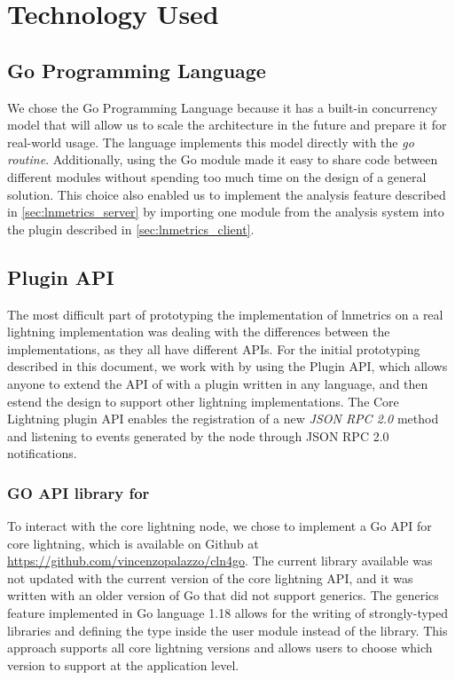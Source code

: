 \chapter{Technology Used}

\section{Go Programming Language}

We chose the Go Programming Language because it has a built-in concurrency model that will allow 
us to scale the architecture in the future and prepare it for real-world usage. 
The language implements this model directly with the \emph{go routine}. Additionally, 
using the Go module made it easy to share code between different modules 
without spending too much time on the design of a general solution. 
This choice also enabled us to implement the analysis feature described in \ref{sec:lnmetrics_server} 
by importing one module from the analysis system into the plugin described in \ref{sec:lnmetrics_client}.

\section{{\CLN} Plugin API}

The most difficult part of prototyping the implementation of lnmetrics on a real 
lightning implementation was dealing with the differences between the implementations, 
as they all have different APIs. For the initial prototyping described in this document,
we work with {\CLN} by using the {\CLN} Plugin API, which allows 
anyone to extend the API of {\CLN} with a plugin written in any language, and then
estend the design to support other lightning implementations.
The Core Lightning plugin API enables the registration 
of a new \emph{JSON RPC 2.0}\cite{jsonrpc} method and listening to 
events generated by the node through JSON RPC 2.0 notifications.

\subsection{GO API library for {\CLN}}

To interact with the core lightning node, we chose to implement a Go API for core 
lightning, which is available on Github at \url{https://github.com/vincenzopalazzo/cln4go}. 
The current library available was not updated with the current version of the core lightning 
API, and it was written with an older version of Go that did not support generics. 
The generics feature implemented in Go language 1.18 allows for the writing of 
strongly-typed libraries and defining the type inside the user module instead of the library. 
This approach supports all core lightning versions and allows users to choose 
which version to support at the application level.

